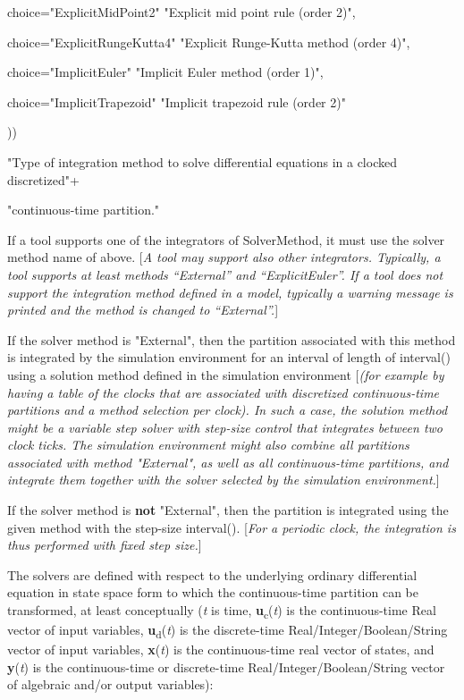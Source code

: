 \documentclass[10pt,a4paper]{report}
\begin{document}
choice="ExplicitMidPoint2" "Explicit mid point rule (order 2)",

choice="ExplicitRungeKutta4" "Explicit Runge-Kutta method (order 4)",

choice="ImplicitEuler" "Implicit Euler method (order 1)",

choice="ImplicitTrapezoid" "Implicit trapezoid rule (order 2)"

))

"Type of integration method to solve differential equations in a clocked
discretized"+

"continuous-time partition."

If a tool supports one of the integrators of SolverMethod, it must use
the solver method name of above. {[}\emph{A tool may support also other
integrators. Typically, a tool supports at least methods ``External''
and ``ExplicitEuler''. If a tool does not support the integration method
defined in a model, typically a warning message is printed and the
method is changed to ``External''.}{]}

If the solver method is "External", then the partition associated with
this method is integrated by the simulation environment for an interval
of length of interval() using a solution method defined in the
simulation environment {[}\emph{(for example by having a table of the
clocks that are associated with discretized continuous-time partitions
and a method selection per clock). In such a case, the solution method
might be a variable step solver with step-size control that integrates
between two clock ticks. The simulation environment might also combine
all partitions associated with method "External", as well as all
continuous-time partitions, and integrate them together with the solver
selected by the simulation environment.}{]}

If the solver method is \textbf{not} "External", then the partition is
integrated using the given method with the step-size interval().
{[}\emph{For a periodic clock, the integration is thus performed with
fixed step size.}{]}

The solvers are defined with respect to the underlying ordinary
differential equation in state space form to which the continuous-time
partition can be transformed, at least conceptually (\emph{t} is time,
\textbf{u}\textsubscript{c}(\emph{t}) is the continuous-time Real vector
of input variables, \textbf{u}\textsubscript{d}(\emph{t}) is the
discrete-time Real/Integer/Boolean/String vector of input variables,
\textbf{x}(\emph{t}) is the continuous-time real vector of states, and
\textbf{y}(\emph{t}) is the continuous-time or discrete-time
Real/Integer/Boolean/String vector of algebraic and/or output
variables):
\end{document}
